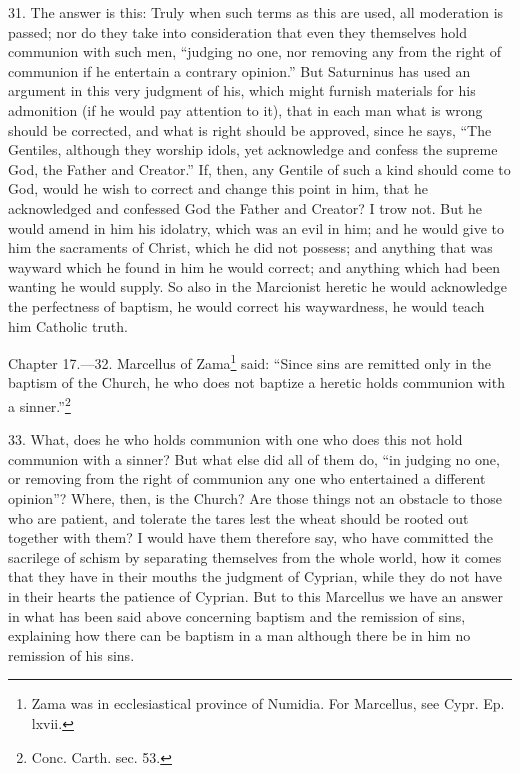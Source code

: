 31. The answer is this: Truly when such terms as this are used, all moderation is passed; nor do they take into consideration that even they themselves hold communion with such men, ``judging no one, nor removing any from the right of communion if he entertain a contrary opinion.'' But Saturninus has used an argument in this very judgment of his, which might furnish materials for his admonition (if he would pay attention to it), that in each man what is wrong should be corrected, and what is right should be approved, since he says, ``The Gentiles, although they worship idols, yet acknowledge and confess the supreme God, the Father and Creator.'' If, then, any Gentile of such a kind should come to God, would he wish to correct and change this point in him, that he acknowledged and confessed God the Father and Creator? I trow not. But he would amend in him his idolatry, which was an evil in him; and he would give to him the sacraments of Christ, which he did not possess; and anything that was wayward which he found in him he would correct; and anything which had been wanting he would supply. So also in the Marcionist heretic he would acknowledge the perfectness of baptism, he would correct his waywardness, he would teach him Catholic truth.


Chapter 17.—32. Marcellus of Zama\footnote{\par  Zama was in ecclesiastical province of Numidia. For Marcellus, see Cypr. Ep. lxvii.} said: ``Since sins are remitted only in the baptism of the Church, he who does not baptize a heretic holds communion with a sinner.''\footnote{\par  Conc. Carth. sec. 53.}

33. What, does he who holds communion with one who does this not hold communion with a sinner? But what else did all of them do, ``in judging no one, or removing from the right of communion any one who entertained a different opinion''? Where, then, is the Church? Are those things not an obstacle to those who are patient, and tolerate the tares lest the wheat should be rooted out together with them? I would have them therefore say, who have committed the sacrilege of schism by separating themselves from the whole world, how it comes that they have in their mouths the judgment of Cyprian, while they do not have in their hearts the patience of Cyprian. But to this Marcellus we have an answer in what has been said above concerning baptism and the remission of sins, explaining how there can be baptism in a man although there be in him no remission of his sins.

